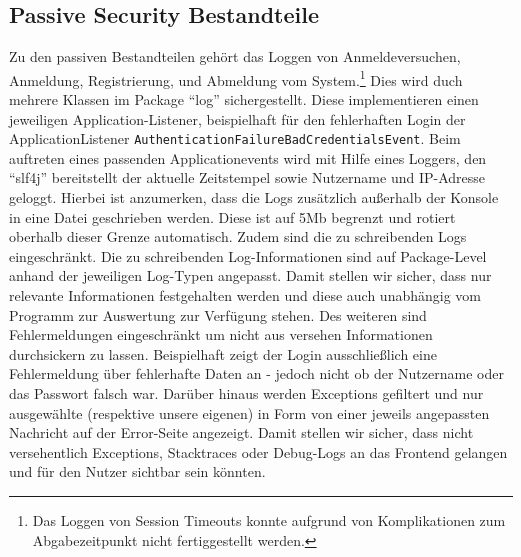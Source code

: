 \subsection{Passive Security Bestandteile}
Zu den passiven Bestandteilen gehört das Loggen von Anmeldeversuchen, Anmeldung, Registrierung, und Abmeldung vom System.\footnote{Das Loggen von Session Timeouts konnte aufgrund von Komplikationen zum Abgabezeitpunkt nicht fertiggestellt werden.}
Dies wird duch mehrere Klassen im Package \enquote{log} sichergestellt. Diese implementieren einen jeweiligen Application-Listener, beispielhaft für den fehlerhaften Login der ApplicationListener \texttt{AuthenticationFailureBadCredentialsEvent}. Beim auftreten eines passenden Applicationevents wird mit Hilfe eines Loggers, den \enquote{slf4j} bereitstellt der aktuelle Zeitstempel sowie Nutzername und IP-Adresse geloggt.
Hierbei ist anzumerken, dass die Logs zusätzlich außerhalb der Konsole in eine Datei geschrieben werden. Diese ist auf 5Mb begrenzt und rotiert oberhalb dieser Grenze automatisch.
Zudem sind die zu schreibenden Logs eingeschränkt. Die zu schreibenden Log-Informationen sind auf Package-Level anhand der jeweiligen Log-Typen angepasst.
Damit stellen wir sicher, dass nur relevante Informationen festgehalten werden und diese auch unabhängig vom Programm zur Auswertung zur Verfügung stehen.
Des weiteren sind Fehlermeldungen eingeschränkt um nicht aus versehen Informationen durchsickern zu lassen. Beispielhaft zeigt der Login ausschließlich eine Fehlermeldung über fehlerhafte Daten an - jedoch nicht ob der Nutzername oder das Passwort falsch war.
Darüber hinaus werden Exceptions gefiltert und nur ausgewählte (respektive unsere eigenen) in Form von einer jeweils angepassten Nachricht auf der Error-Seite angezeigt. Damit stellen wir sicher, dass nicht versehentlich Exceptions, Stacktraces oder Debug-Logs an das Frontend gelangen und für den Nutzer sichtbar sein könnten.
